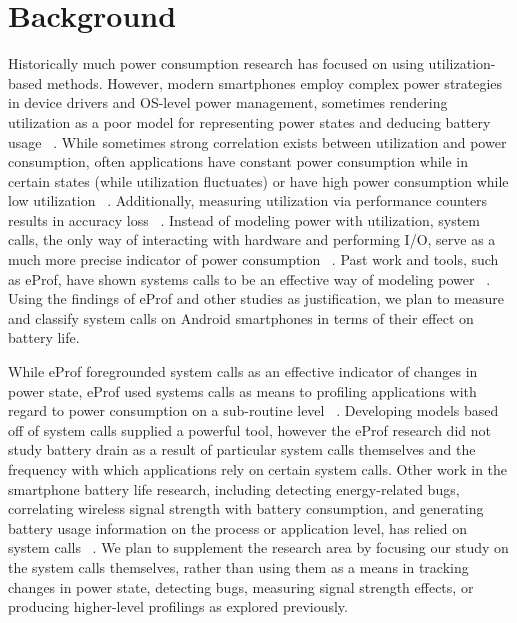 \documentclass[11pt]{article}
\begin{document}
\section{Background}

Historically much power consumption research has focused on using utilization-based
methods.  However, modern smartphones employ complex power strategies in device 
drivers and OS-level power management, sometimes rendering utilization as a poor 
model for representing power states and deducing battery usage ~\cite{pathak-systemcall}.  While 
sometimes strong correlation exists between utilization and power consumption, often 
applications have constant power consumption while in certain states (while 
utilization fluctuates) or have high power consumption while low utilization ~\cite{pathak-systemcall,google-androiddev}.  
Additionally, measuring utilization via performance counters results in accuracy 
loss ~\cite{pathak-systemcall}.  Instead of modeling power with utilization, system calls, the only way of 
interacting with hardware and performing I/O, serve as a much more precise indicator 
of power consumption ~\cite{pathak-systemcall}.  Past work and tools, such as eProf, have shown systems 
calls to be an effective way of modeling power ~\cite{pathak-systemcall,yoon-appscope,pathak-eprof,ding-signals}.  Using the findings 
of eProf and other studies as justification, we plan to measure and classify system 
calls on Android smartphones in terms of their effect on battery life.

While eProf foregrounded system calls as an effective indicator of changes in power
state, eProf used systems calls as means to profiling applications with regard to power 
consumption on a sub-routine level ~\cite{pathak-systemcall,pathak-eprof}.  Developing models based off of system 
calls supplied a powerful tool, however the eProf research did not study battery drain 
as a result of  particular system calls themselves and the frequency with which 
applications rely on certain system calls.  Other work in the smartphone battery life 
research, including detecting energy-related bugs, correlating wireless signal strength 
with battery consumption, and generating battery usage information on the process or 
application level, has relied on system calls ~\cite{yoon-appscope,pathak-bugs,ding-signals}.  We plan to supplement the 
research area by focusing our study on the system calls themselves, rather than using 
them as a means in tracking changes in power state, detecting bugs, measuring signal 
strength effects, or producing higher-level profilings as explored previously.
\end{document}
